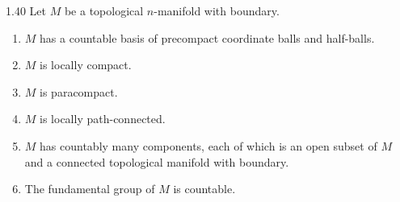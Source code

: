 \begin{prop}{1.40}
    Let \( M \) be a topological \( n \)-manifold with boundary.
    \begin{enumerate}[itemsep=0pt,label={(\alph*)}]
        \item \( M \) has a countable basis of precompact coordinate balls and half-balls.
        \item \( M \) is locally compact.
        \item \( M \) is paracompact.
        \item \( M \) is locally path-connected.
        \item \( M \) has countably many components, each of which is an open subset of \( M \) and a connected topological manifold with boundary.
        \item The fundamental group of \( M \) is countable.
    \end{enumerate}
\end{prop}

